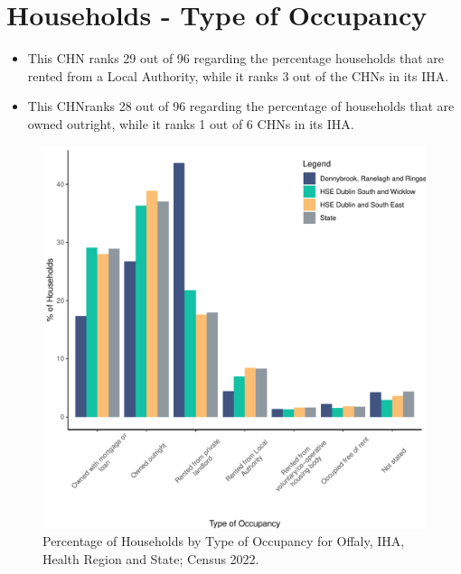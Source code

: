 \documentclass{article}
\begin{document}
\section{Households - Type of Occupancy}\label{sect:Households}
\begin{itemize}
\item This CHN ranks  29 out of 96 regarding the percentage households that are rented from a Local Authority, while it ranks  3 out of the CHNs in its IHA. 
\item This CHNranks  28 out of 96 regarding the percentage of households that are owned outright, while it ranks   1 out of 6 CHNs in its IHA.
\end{itemize}
\begin{figure}[H]
	\centering
	\includegraphics[width = 140mm]{../figures/HouseholdsED.pdf}
	\caption{Percentage of Households by Type of Occupancy for Offaly, IHA, Health Region and State; Census 2022.}
	\label{fig:vbnv}
	\end{figure}
\end{document}
